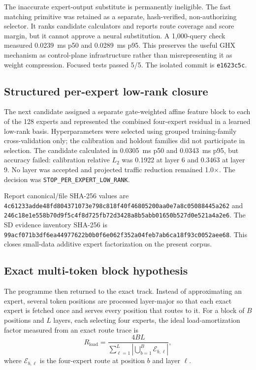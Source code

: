 The inaccurate expert-output substitute is permanently ineligible.  The fast
matching primitive was retained as a separate, hash-verified, non-authorizing
selector.  It ranks candidate calculators and reports route coverage and score
margin, but it cannot approve a neural substitution.  A 1,000-query check
measured 0.0239~ms p50 and 0.0289~ms p95.  This preserves the useful GHX
mechanism as control-plane infrastructure rather than misrepresenting it as
weight compression.  Focused tests passed 5/5.  The isolated commit is
\texttt{e1623c5c}.

\subsection{Structured per-expert low-rank closure}

The next candidate assigned a separate gate-weighted affine feature block to
each of the 128 experts and represented the combined four-expert residual in a
learned low-rank basis.  Hyperparameters were selected using grouped
training-family cross-validation only; the calibration and holdout families
did not participate in selection.  The candidate calculated in 0.0305~ms p50
and 0.0343~ms p95, but accuracy failed: calibration relative $L_2$ was 0.1922
at layer 6 and 0.3463 at layer 9.  No layer was accepted and projected traffic
reduction remained 1.0$\times$.  The decision was
\texttt{STOP\_PER\_EXPERT\_LOW\_RANK}.

Report canonical/file SHA-256 values are
\texttt{4c61233adde48fd804371073e798c818f40f46805200aa0e7a8c05088445a262}
and
\texttt{246c18e1e558b70d9f5c4f8d725fb72d3428a8b5abb01650b527d0e521a4a2e6}.
The SD evidence inventory SHA-256 is
\texttt{99acf071b3df6ea44977622b0b0f6e062f352a04feb7ab6ca18f93c0052aee68}.
This closes small-data additive expert factorization on the present corpus.

\subsection{Exact multi-token block hypothesis}

The programme then returned to the exact track.  Instead of approximating an
expert, several token positions are processed layer-major so that each exact
expert is fetched once and serves every position that routes to it.  For a
block of $B$ positions and $L$ layers, each selecting four experts, the ideal
load-amortization factor measured from an exact route trace is
\begin{equation}
R_{\mathrm{load}} =
\frac{4BL}{\displaystyle\sum_{\ell=1}^{L}
\left|\bigcup_{b=1}^{B}\mathcal{E}_{b,\ell}\right|},
\end{equation}
where $\mathcal{E}_{b,\ell}$ is the four-expert route at position $b$ and
layer $\ell$.

